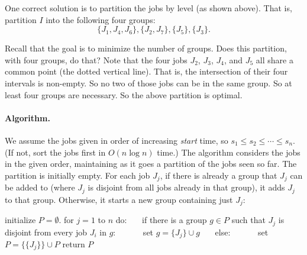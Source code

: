 \smallskip

One correct solution is to partition the jobs by level (as shown above).
That is, partition $I$ into the following four groups:
\[\{J_1, J_4, J_6\}, \{J_2, J_7\}, \{J_5\}, \{J_3\}.\]

Recall that the goal is to minimize the number of groups.
Does this partition, with four groups, do that?
Note that the four jobs $J_2$, $J_3$, $J_4$, and $J_5$ all share a common point (the dotted vertical line).
That is, the intersection of their four intervals is non-empty.
So no two of those jobs can be in the same group.
So at least four groups are necessary.
So the above partition is optimal.

\paragraph{Algorithm.}
We assume the jobs given in order of increasing \emph{start} time, so $s_1 \le s_2 \le \cdots \le s_n$.
(If not, sort the jobs first in $O(n\log n)$ time.)
The algorithm considers the jobs in the given order,
maintaining as it goes a partition of the jobs seen so far.
The partition is initially empty.
For each job $J_j$, if there is already a group that $J_j$ can be added to
(where $J_j$ is disjoint from all jobs already in that group),
it adds $J_j$ to that group.
Otherwise, it starts a new group containing just $J_j$:

\begin{myframed}
  \begin{steps}
  \item[{\textsf{partition}$(I=\{J_1, J_2, \ldots, J_n\})$:}]
    \step initialize $P = \emptyset$.  
    \step for $j=1$ to $n$ do:
    \step~~~if there is a group $g\in P$ such that $J_j$ is disjoint from every job $J_i$ in $g$:
    \step~~~~~~set $g = \{J_j\} \cup g$ 
    \step~~~else:
    \step~~~~~~set $P = \big\{\{J_j\}\big\} \cup P$
    \step return $P$
  \end{steps}
\end{myframed}

